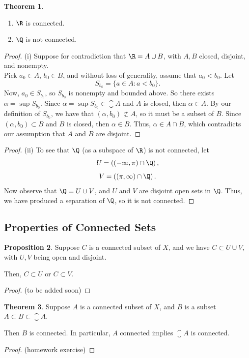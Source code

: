 \documentclass[a5paper]{article}
\theoremstyle{definition}%
\newtheorem{theorem}{Theorem}
\newtheorem{proposition}[theorem]{Proposition}
\numberwithin{exercise}{section}
\theoremstyle{remark}%
\begin{document}
\begin{highlight}
\begin{theorem}\mbox{}
\begin{enumerate}[label=(\roman*)]
\item $\R$ is connected. 
\item $\Q$ is not connected. 
\end{enumerate}
\end{theorem}
\end{highlight}
\begin{proof}(i)
Suppose for contradiction that $\R= A\cup B$, with $A,B$ closed, disjoint, and nonempty.\\
 Pick $a_0\in A$, $b_0\in B$, and without loss of generality, assume that $a_0<b_0$. Let $$S_{b_0}=\{a\in A: a<b_0\}.$$ Now, $a_0\in S_{b_0}$, so $S_{b_0}$ is nonempty and bounded above. So there exists $\alpha=\sup{S_{b_0}}$. Since $\alpha=\sup{S_{b_0}}\in \closure{A}$ and $A$ is closed, then $\alpha\in A$. By our definition of $S_{b_0}$, we have that $(\alpha, b_0)\not\subset A$, so it must be a subset of $B$. Since $(\alpha, b_0)\subset B$ and $B$ is closed, then $\alpha \in B$. Thus, $\alpha\in A\cap B$, which contradicts our assumption that $A$ and $B$ are disjoint. 
\end{proof}
\begin{proof}(ii)
To see that $\Q$ (as a subspace of $\R$) is not connected, let 
$$U=\left((-\infty, \pi)\cap\Q\right),$$
$$V=\left((\pi, \infty)\cap\Q\right).$$
Now observe that $\Q=U\cup V$, and $U$ and $V$ are disjoint open sets in $\Q$. Thus, we have produced a separation of $\Q$, so it is not connected. 
\end{proof}

\subsection{Properties of Connected Sets}
\begin{highlight}
\begin{proposition}
Suppose $C$ is a connected subset of $X$, and we have ${C\subset U \cup V}$, with $U,V$ being open and disjoint. 

Then, $C\subset U$ or $C\subset V$. 
\end{proposition}
\end{highlight}
\begin{proof}
(to be added soon)
\end{proof}

\begin{highlight}
\begin{theorem}
Suppose $A$ is a connected subset of $X$, and $B$ is a subset $A\subset B\subset \closure{A}$. 

Then $B$ is connected. In particular, $A$ connected implies $\closure{A}$ is connected. 
\end{theorem}
\end{highlight}
\begin{proof}
(homework exercise)
\end{proof}
\end{document}
